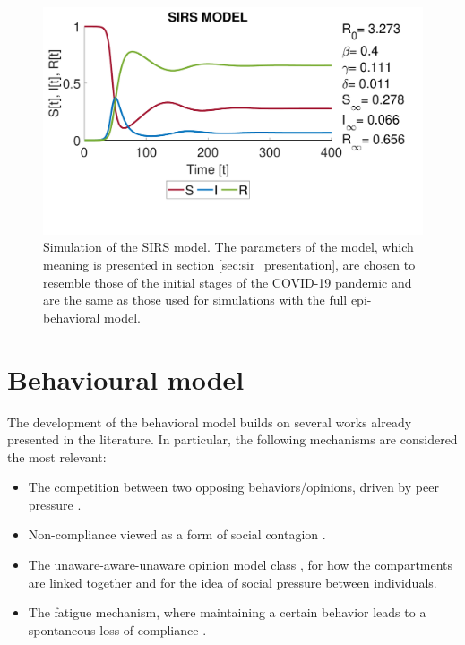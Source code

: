 \begin{figure}[ht]
	\centering
	\includegraphics[width=0.6\linewidth]{1_corpo/figure/r0/sirs_figure}
	\caption[SIRS simulation]{Simulation of the SIRS model. The parameters of the model, which meaning is presented in section \ref{sec:sir_presentation}, are chosen to resemble those of the initial stages of the COVID-19 pandemic \cite{data_R0_covid} and are the same as those used for simulations with the full epi-behavioral model.}
	\label{fig:sirsfigure}
\end{figure}

\section{Behavioural model}
\label{sec:behavioral_model}

The development of the behavioral model builds on several works already presented in the literature. In particular, the following mechanisms are considered the most relevant:
\begin{itemize}
	\item The competition between two opposing behaviors/opinions, driven by peer pressure \cite{Epstein_2021}.
	\item Non-compliance viewed as a form of social contagion \cite{Bongarti2023}.
	\item The unaware-aware-unaware opinion model class \cite{Zuo2022, Peng2021}, for how the compartments are linked together and for the idea of social pressure between individuals.
	\item The fatigue mechanism, where maintaining a certain behavior leads to a spontaneous loss of compliance \cite{Epstein_2021}.
\end{itemize}

